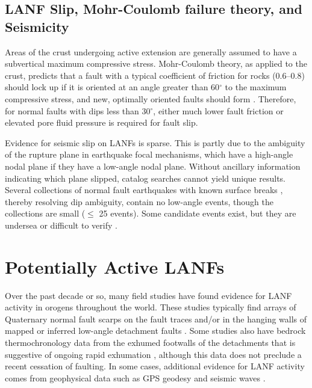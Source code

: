 \documentclass[twocolumn,grl]{AGUTeX}
\begin{document}
\begin{article}
\subsection{LANF Slip, Mohr-Coulomb failure theory, and Seismicity}

Areas of the crust undergoing active extension are generally assumed
to have a subvertical maximum compressive stress.  Mohr-Coulomb
theory, as applied to the crust, predicts that a fault with a typical
coefficient of friction for rocks (0.6--0.8) should lock up if it is
oriented at an angle greater than 60$^\circ$ to the maximum compressive stress,
and new, optimally oriented faults should form \citep{sibson1985}.  Therefore,
for normal faults with dips less than 30$^\circ$, either much lower
fault friction or elevated pore fluid pressure is required for fault slip.

Evidence for seismic slip on LANFs is sparse.  This is partly due to the
ambiguity of the rupture plane in earthquake focal mechanisms, which have a
high-angle nodal plane if they have a low-angle nodal plane.  Without
ancillary information indicating which plane slipped, catalog searches 
cannot yield unique results.  Several collections of normal fault earthquakes
with known surface breaks \citep{jackson1987, collettinisibson2001}, thereby
resolving dip ambiguity, contain no low-angle events, though the collections
are small ($\le$ 25 events).  Some candidate events exist, but they are
undersea \citep[e.g.][]{abers2001} or difficult to verify \citep[e.g.]
[]{doser1987ancash}.


\section{Potentially Active LANFs}

Over the past decade or so, many field studies have found evidence for LANF 
activity in orogens throughout the world. These studies typically find arrays of 
Quaternary normal fault scarps on the fault traces and/or in the hanging walls 
of mapped or inferred low-angle detachment faults \citep [e.g.,]
[]{axen1999baja}. Some studies also have bedrock thermochronology data from the 
exhumed footwalls of the detachments that is suggestive of ongoing rapid 
exhumation \citep [e.g.,][]{sundell2013lunggar}, although this data does not 
preclude a recent cessation of faulting. In some cases, additional evidence for 
LANF activity comes from geophysical data such as GPS geodesy \citep [e.g.,]
[]{hreinsdottir2009altotib} and seismic waves \citep [e.g.,][]{doser1987ancash}.


\end{article}
\end{document}
